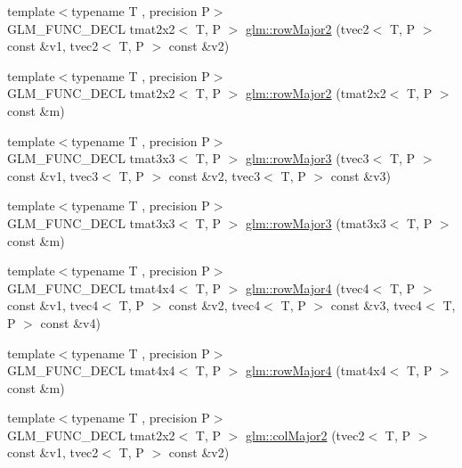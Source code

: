 \begin{DoxyCompactItemize}
\item 
{\footnotesize template$<$typename T , precision P$>$ }\\G\-L\-M\-\_\-\-F\-U\-N\-C\-\_\-\-D\-E\-C\-L tmat2x2$<$ T, P $>$ \hyperlink{group__gtx__matrix__major__storage_ga0c7f4d56a85865f0002127119ab7d551}{glm\-::row\-Major2} (tvec2$<$ T, P $>$ const \&v1, tvec2$<$ T, P $>$ const \&v2)
\item 
{\footnotesize template$<$typename T , precision P$>$ }\\G\-L\-M\-\_\-\-F\-U\-N\-C\-\_\-\-D\-E\-C\-L tmat2x2$<$ T, P $>$ \hyperlink{group__gtx__matrix__major__storage_ga42a006aa66198452bd3c89415f892196}{glm\-::row\-Major2} (tmat2x2$<$ T, P $>$ const \&m)
\item 
{\footnotesize template$<$typename T , precision P$>$ }\\G\-L\-M\-\_\-\-F\-U\-N\-C\-\_\-\-D\-E\-C\-L tmat3x3$<$ T, P $>$ \hyperlink{group__gtx__matrix__major__storage_gaba4de9afc4e65ec8ea0403e7cba3fb9f}{glm\-::row\-Major3} (tvec3$<$ T, P $>$ const \&v1, tvec3$<$ T, P $>$ const \&v2, tvec3$<$ T, P $>$ const \&v3)
\item 
{\footnotesize template$<$typename T , precision P$>$ }\\G\-L\-M\-\_\-\-F\-U\-N\-C\-\_\-\-D\-E\-C\-L tmat3x3$<$ T, P $>$ \hyperlink{group__gtx__matrix__major__storage_ga38537061135b55e7a053926ca55e6e20}{glm\-::row\-Major3} (tmat3x3$<$ T, P $>$ const \&m)
\item 
{\footnotesize template$<$typename T , precision P$>$ }\\G\-L\-M\-\_\-\-F\-U\-N\-C\-\_\-\-D\-E\-C\-L tmat4x4$<$ T, P $>$ \hyperlink{group__gtx__matrix__major__storage_ga3ce8f2a78fb2f15bf28151ee128b0ae8}{glm\-::row\-Major4} (tvec4$<$ T, P $>$ const \&v1, tvec4$<$ T, P $>$ const \&v2, tvec4$<$ T, P $>$ const \&v3, tvec4$<$ T, P $>$ const \&v4)
\item 
{\footnotesize template$<$typename T , precision P$>$ }\\G\-L\-M\-\_\-\-F\-U\-N\-C\-\_\-\-D\-E\-C\-L tmat4x4$<$ T, P $>$ \hyperlink{group__gtx__matrix__major__storage_ga85771a88c114a088a0414bcfce55e729}{glm\-::row\-Major4} (tmat4x4$<$ T, P $>$ const \&m)
\item 
{\footnotesize template$<$typename T , precision P$>$ }\\G\-L\-M\-\_\-\-F\-U\-N\-C\-\_\-\-D\-E\-C\-L tmat2x2$<$ T, P $>$ \hyperlink{group__gtx__matrix__major__storage_ga599fff4f1c65912b256a82138ebcca37}{glm\-::col\-Major2} (tvec2$<$ T, P $>$ const \&v1, tvec2$<$ T, P $>$ const \&v2)

\end{DoxyCompactItemize}
